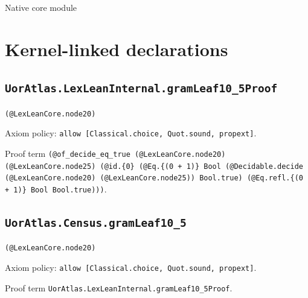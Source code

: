 \documentclass[11pt]{article}
\begin{document}
\begin{center}{\LARGE Native core module}\end{center}
\section*{Kernel-linked declarations}
\subsection*{\texttt{UorAtlas.LexLeanInternal.gramLeaf10\_5Proof}}
\noindent\texttt{(@LexLeanCore.node20)}\par
\noindent Axiom policy: \texttt{allow [Classical.choice, Quot.sound, propext]}.\par
\noindent Proof term \texttt{(@of\_decide\_eq\_true (@LexLeanCore.node20) (@LexLeanCore.node25) (@id.\{0\} (@Eq.\{(0 + 1)\} Bool (@Decidable.decide (@LexLeanCore.node20) (@LexLeanCore.node25)) Bool.true) (@Eq.refl.\{(0 + 1)\} Bool Bool.true)))}.\par
\subsection*{\texttt{UorAtlas.Census.gramLeaf10\_5}}
\noindent\texttt{(@LexLeanCore.node20)}\par
\noindent Axiom policy: \texttt{allow [Classical.choice, Quot.sound, propext]}.\par
\noindent Proof term \texttt{UorAtlas.LexLeanInternal.gramLeaf10\_5Proof}.\par
\end{document}
